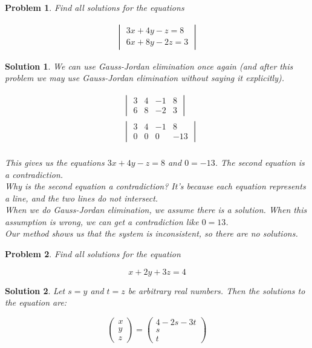 \documentclass{article}
\newtheorem{problem}{Problem}
\newtheorem*{solution}{Solution}
\begin{document}
\begin{problem}
Find all solutions for the equations

\begin{align*}
\begin{vmatrix}
3x + 4y - z = 8 \\
6x + 8y - 2z = 3
\end{vmatrix}
\end{align*}

\end{problem}

\begin{solution}

We can use Gauss-Jordan elimination once again (and after this problem we may use Gauss-Jordan elimination without saying it explicitly).

\begin{align*}
&\begin{vmatrix}
3 & 4 & -1 & 8 \\ 
6 & 8 & -2 & 3 
\end{vmatrix} \\
&\begin{vmatrix}
3 & 4 & -1 & 8 \\ 
0 & 0 & 0 & -13 
\end{vmatrix} \\
\end{align*}

This gives us the equations $3x + 4y - z = 8$ and $0 = -13$. The second equation is a contradiction. \\

Why is the second equation a contradiction? It's because each equation represents a line, and the two lines do not intersect. \\

When we do Gauss-Jordan elimination, we assume there is a solution. When this assumption is wrong, we can get a contradiction like $0 = 13$. \\

Our method shows us that the system is inconsistent, so there are no solutions.

\end{solution}

\begin{problem}
Find all solutions for the equation 

\begin{equation*}
x + 2y + 3z = 4
\end{equation*}
\end{problem}

\begin{solution}
Let $s = y$ and $t = z$ be arbitrary real numbers. Then the solutions to the equation are:

\begin{equation*}
\begin{pmatrix}
x \\ y \\ z 
\end{pmatrix} 
= 
\begin{pmatrix}
4 - 2s - 3t \\
s \\
t
\end{pmatrix}
\end{equation*}

\end{solution}
\end{document}
